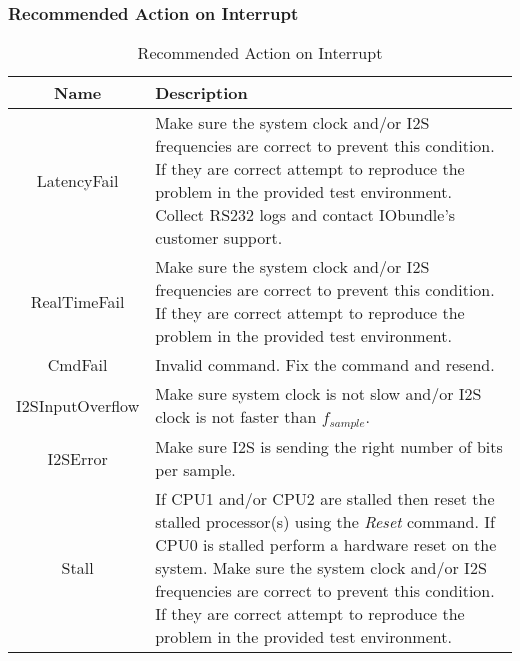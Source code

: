 \documentclass{rep}
\theoremstyle{plain}
\begin{document}
\subsubsection{Recommended Action on Interrupt}
\label{sec:intrrptact}

  \begin{table}[H]
  \begin{center}
    \begin{tabular}{|c|p{9cm}|}
      \hline
      \rowcolor{iob-green}
      \textbf{Name} & \textbf{Description}  \\
      \hline
      \hline

      LatencyFail & Make sure the system clock and/or I2S frequencies are
      correct to prevent this condition. If they are correct attempt to
      reproduce the problem in the provided test environment. Collect RS232 logs
      and contact IObundle's customer support. \\ \hline

      \rowcolor{iob-blue}
      RealTimeFail & Make sure the system clock and/or I2S
      frequencies are correct to prevent this condition. If they are correct
      attempt to reproduce the problem in the provided test
      environment. \\ \hline

      CmdFail & Invalid command. Fix the command and resend.\\ \hline

      \rowcolor{iob-blue}
      I2SInputOverflow & Make sure system clock is not slow and/or I2S clock is not
      faster than $f_{sample}$.\\ \hline

      I2SError & Make sure I2S is sending the right number
      of bits per sample.\\ \hline

      \rowcolor{iob-blue}
      Stall & If CPU1 and/or CPU2 are stalled then reset the stalled
      processor(s) using the {\em Reset} command. If CPU0 is stalled perform a
      hardware reset on the system. Make sure the system clock and/or I2S
      frequencies are correct to prevent this condition. If they are correct
      attempt to reproduce the problem in the provided test
      environment.\\ \hline

    \end{tabular}
    \caption{Recommended Action on Interrupt}
    \label{tab:intrrptact}
  \end{center}
\end{table}
\end{document}
